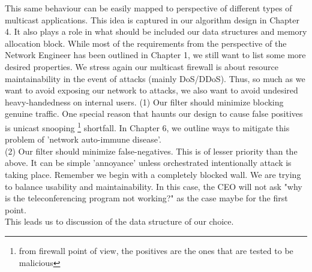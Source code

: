\documentclass[11pt,left=2cm,bottom=2cm,oneside]{book}
\begin{document}
This
same behaviour can be easily mapped to perspective of different types of
multicast
applications. This idea is captured in our algorithm design in Chapter 4. It
also
plays a role in what should be included our data structures and memory
allocation
block.
While most of the requirements from the perspective of the Network Engineer
has been outlined in Chapter 1, we still want to list some more desired
properties.
We stress again our multicast firewall is about resource maintainability in
the event
of attacks (mainly DoS/DDoS). Thus, so much as we want to avoid exposing our
network to attacks, we also want to avoid undesired heavy-handedness on
internal
users.
(1) Our filter should minimize blocking genuine traffic. One special reason
that haunts our design to cause false positives is unicast snooping 
\footnote{from firewall point of view, the positives are the ones that are tested to be
malicious}
shortfall. In Chapter 6, we outline ways to mitigate this problem of 'network
auto-immune disease'.\\
(2) Our filter should minimize false-negatives. This is of lesser priority
than
the above. It can be simple 'annoyance' unless orchestrated intentionally
attack is taking place. Remember we begin with a completely blocked
wall. We are trying to balance usability and maintainability. In this case,
the CEO will not ask "why is the teleconferencing program not working?"
as the case maybe for the first point.\\
This leads us to discussion of the data structure of our choice.
\end{document}

